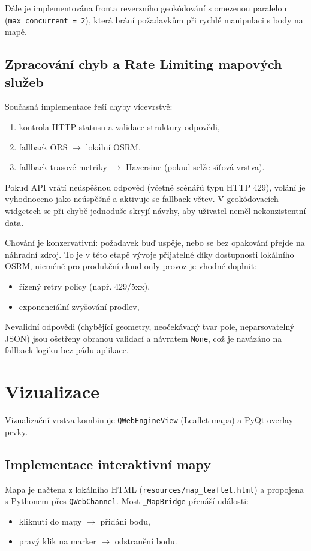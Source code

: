 Dále je implementována fronta reverzního geokódování s omezenou paralelou (\texttt{max\_concurrent = 2}), která brání požadavkům při rychlé manipulaci s body na mapě.

\subsection{Zpracování chyb a Rate Limiting mapových služeb}
Současná implementace řeší chyby vícevrstvě:
\begin{enumerate}
    \item kontrola HTTP statusu a validace struktury odpovědi,
    \item fallback ORS \(\rightarrow\) lokální OSRM,
    \item fallback trasové metriky \(\rightarrow\) Haversine (pokud selže síťová vrstva).
\end{enumerate}

Pokud API vrátí neúspěšnou odpověď (včetně scénářů typu HTTP 429), volání je vyhodnoceno jako neúspěšné a aktivuje se fallback větev. V geokódovacích widgetech se při chybě jednoduše skryjí návrhy, aby uživatel neměl nekonzistentní data.

Chování je konzervativní: požadavek buď uspěje, nebo se bez opakování přejde na náhradní zdroj. To je v této etapě vývoje přijatelné díky dostupnosti lokálního OSRM, nicméně pro produkční cloud-only provoz je vhodné doplnit:
\begin{itemize}
    \item řízený retry policy (např. 429/5xx),
    \item exponenciální zvyšování prodlev,
\end{itemize}

Nevalidní odpovědi (chybějící geometry, neočekávaný tvar pole, neparsovatelný JSON) jsou ošetřeny obranou validací a návratem \texttt{None}, což je navázáno na fallback logiku bez pádu aplikace.

\section{Vizualizace}
Vizualizační vrstva kombinuje \texttt{QWebEngineView} (Leaflet mapa) a PyQt overlay prvky.

\subsection{Implementace interaktivní mapy}
Mapa je načtena z lokálního HTML (\texttt{resources/map\_leaflet.html}) a propojena s Pythonem přes \texttt{QWebChannel}. Most \texttt{\_MapBridge} přenáší události:
\begin{itemize}
    \item kliknutí do mapy \(\rightarrow\) přidání bodu,
    \item pravý klik na marker \(\rightarrow\) odstranění bodu.
\end{itemize}

